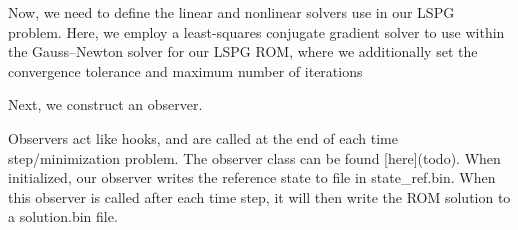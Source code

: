 Now, we need to define the linear and nonlinear solvers use in our L\+S\+PG problem. Here, we employ a least-\/squares conjugate gradient solver to use within the Gauss--Newton solver for our L\+S\+PG R\+OM, where we additionally set the convergence tolerance and maximum number of iterations 
\begin{DoxyCode}{0}
\DoxyCodeLine{\textcolor{comment}{// linear solver}}
\DoxyCodeLine{}
\DoxyCodeLine{\textcolor{comment}{// GaussNewton solver with normal equations}}
\end{DoxyCode}


Next, we construct an observer.


\begin{DoxyCode}{0}
\DoxyCodeLine{\textcolor{comment}{// create observer (see rom\_time\_integration\_observer.hpp in parent dir)}}
\end{DoxyCode}


Observers act like hooks, and are called at the end of each time step/minimization problem. The observer class can be found \mbox{[}here\mbox{]}(todo). When initialized, our observer writes the reference state to file in {\ttfamily state\+\_\+ref.\+bin}. When this observer is called after each time step, it will then write the R\+OM solution to a {\ttfamily solution.\+bin} file.

